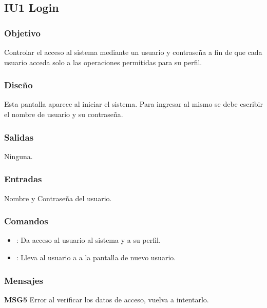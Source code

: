 \subsection{IU1 Login}

\subsubsection{Objetivo}
	Controlar el acceso al sistema mediante un usuario y contraseña a fin de que cada usuario acceda solo a las operaciones permitidas para su perfil.

\subsubsection{Diseño}
	Esta pantalla aparece al iniciar el sistema. Para ingresar al mismo se debe escribir el nombre de usuario y su contrase\~na. 


\subsubsection{Salidas}

	Ninguna.

\subsubsection{Entradas}
Nombre y Contrase\~na del usuario.

\subsubsection{Comandos}
\begin{itemize}
	\item {}: Da acceso al usuario al sistema y a su perfil.
	

	\item {}: Lleva al usuario a a la pantalla de nuevo usuario.
	
\end{itemize}

\subsubsection{Mensajes}
	\begin{Citemize}
		\item {\bf MSG5} Error al verificar los datos de acceso, vuelva a intentarlo.
	\end{Citemize}